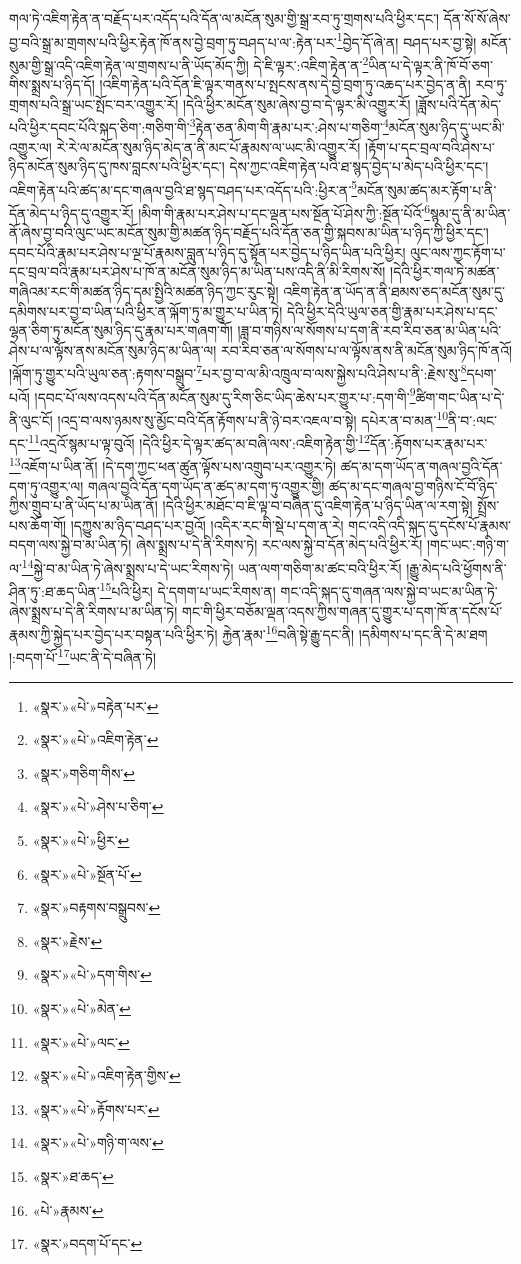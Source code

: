 གལ་ཏེ་འཇིག་རྟེན་ན་བརྗོད་པར་འདོད་པའི་དོན་ལ་མངོན་སུམ་གྱི་སྒྲ་རབ་ཏུ་གྲགས་པའི་ཕྱིར་དང་། དོན་སོ་སོ་ཞེས་བྱ་བའི་སྒྲ་མ་གྲགས་པའི་ཕྱིར་རྟེན་ཁོ་ནས་བྱེ་བྲག་ཏུ་བཤད་པ་ལ་:རྟེན་པར་\footnote{«སྣར་»«པེ་»བརྟེན་པར་}བྱེད་དོ་ཞེ་ན། བཤད་པར་བྱ་སྟེ། མངོན་སུམ་གྱི་སྒྲ་འདི་འཇིག་རྟེན་ལ་གྲགས་པ་ནི་ཡོད་མོད་ཀྱི། དེ་ཇི་ལྟར་:འཇིག་རྟེན་ན་\footnote{«སྣར་»«པེ་»འཇིག་རྟེན་}ཡིན་པ་དེ་ལྟར་ནི་ཁོ་བོ་ཅག་གིས་སྨྲས་པ་ཉིད་དོ། །འཇིག་རྟེན་པའི་དོན་ཇི་ལྟར་གནས་པ་སྤངས་ནས་དེ་བྱེ་བྲག་ཏུ་འཆད་པར་བྱེད་ན་ནི། རབ་ཏུ་གྲགས་པའི་སྒྲ་ཡང་སྤོང་བར་འགྱུར་རོ། །དེའི་ཕྱིར་མངོན་སུམ་ཞེས་བྱ་བ་དེ་ལྟར་མི་འགྱུར་རོ། །ཟློས་པའི་དོན་མེད་པའི་ཕྱིར་དབང་པོའི་སྐད་ཅིག་:གཅིག་གི་\footnote{«སྣར་»གཅིག་གིས་}རྟེན་ཅན་མིག་གི་རྣམ་པར་:ཤེས་པ་གཅིག་\footnote{«སྣར་»«པེ་»ཤེས་པ་ཅིག་}མངོན་སུམ་ཉིད་དུ་ཡང་མི་འགྱུར་ལ། རེ་རེ་ལ་མངོན་སུམ་ཉིད་མེད་ན་ནི་མང་པོ་རྣམས་ལ་ཡང་མི་འགྱུར་རོ། །རྟོག་པ་དང་བྲལ་བའི་ཤེས་པ་ཉིད་མངོན་སུམ་ཉིད་དུ་ཁས་བླངས་པའི་ཕྱིར་དང་། དེས་ཀྱང་འཇིག་རྟེན་པའི་ཐ་སྙད་བྱེད་པ་མེད་པའི་ཕྱིར་དང་། འཇིག་རྟེན་པའི་ཚད་མ་དང་གཞལ་བྱའི་ཐ་སྙད་བཤད་པར་འདོད་པའི་:ཕྱིར་ན་\footnote{«སྣར་»«པེ་»ཕྱིར་}མངོན་སུམ་ཚད་མར་རྟོག་པ་ནི་དོན་མེད་པ་ཉིད་དུ་འགྱུར་རོ། །མིག་གི་རྣམ་པར་ཤེས་པ་དང་ལྡན་པས་སྔོན་པོ་ཤེས་ཀྱི་:སྔོན་པོའོ་\footnote{«སྣར་»«པེ་»སྔོན་པོ་}སྙམ་དུ་ནི་མ་ཡིན་ནོ་ཞེས་བྱ་བའི་ལུང་ཡང་མངོན་སུམ་གྱི་མཚན་ཉིད་བརྗོད་པའི་དོན་ཅན་གྱི་སྐབས་མ་ཡིན་པ་ཉིད་ཀྱི་ཕྱིར་དང་། དབང་པོའི་རྣམ་པར་ཤེས་པ་ལྔ་པོ་རྣམས་བླུན་པ་ཉིད་དུ་སྟོན་པར་བྱེད་པ་ཉིད་ཡིན་པའི་ཕྱིར། ལུང་ལས་ཀྱང་རྟོག་པ་དང་བྲལ་བའི་རྣམ་པར་ཤེས་པ་ཁོ་ན་མངོན་སུམ་ཉིད་མ་ཡིན་པས་འདི་ནི་མི་རིགས་སོ། །དེའི་ཕྱིར་གལ་ཏེ་མཚན་གཞིའམ་རང་གི་མཚན་ཉིད་དམ་སྤྱིའི་མཚན་ཉིད་ཀྱང་རུང་སྟེ། འཇིག་རྟེན་ན་ཡོད་ན་ནི་ཐམས་ཅད་མངོན་སུམ་དུ་དམིགས་པར་བྱ་བ་ཡིན་པའི་ཕྱིར་ན་ལྐོག་ཏུ་མ་གྱུར་པ་ཡིན་ཏེ། དེའི་ཕྱིར་དེའི་ཡུལ་ཅན་གྱི་རྣམ་པར་ཤེས་པ་དང་ལྷན་ཅིག་ཏུ་མངོན་སུམ་ཉིད་དུ་རྣམ་པར་གཞག་གོ། །ཟླ་བ་གཉིས་ལ་སོགས་པ་དག་ནི་རབ་རིབ་ཅན་མ་ཡིན་པའི་ཤེས་པ་ལ་ལྟོས་ནས་མངོན་སུམ་ཉིད་མ་ཡིན་ལ། རབ་རིབ་ཅན་ལ་སོགས་པ་ལ་ལྟོས་ནས་ནི་མངོན་སུམ་ཉིད་ཁོ་ནའོ། །ལྐོག་ཏུ་གྱུར་པའི་ཡུལ་ཅན་:རྟགས་བསྒྲུབ་\footnote{«སྣར་»བརྟགས་བསྒྲུབས་}པར་བྱ་བ་ལ་མི་འཁྲུལ་བ་ལས་སྐྱེས་པའི་ཤེས་པ་ནི་:རྗེས་སུ་\footnote{«སྣར་»རྗེས་}དཔག་པའོ། །དབང་པོ་ལས་འདས་པའི་དོན་མངོན་སུམ་དུ་རིག་ཅིང་ཡིད་ཆེས་པར་གྱུར་པ་:དག་གི་\footnote{«སྣར་»«པེ་»དག་གིས་}ཚིག་གང་ཡིན་པ་དེ་ནི་ལུང་ངོ། །འདྲ་བ་ལས་ཉམས་སུ་མྱོང་བའི་དོན་རྟོགས་པ་ནི་ཉེ་བར་འཇལ་བ་སྟེ། དཔེར་ན་བ་མན་\footnote{«སྣར་»«པེ་»མེན་}ནི་བ་:ལང་དང་\footnote{«སྣར་»«པེ་»ལང་}འདྲའོ་སྙམ་པ་ལྟ་བུའོ། །དེའི་ཕྱིར་དེ་ལྟར་ཚད་མ་བཞི་ལས་:འཇིག་རྟེན་གྱི་\footnote{«སྣར་»«པེ་»འཇིག་རྟེན་གྱིས་}དོན་:རྟོགས་པར་རྣམ་པར་\footnote{«སྣར་»«པེ་»རྟོགས་པར་}འཇོག་པ་ཡིན་ནོ། །དེ་དག་ཀྱང་ཕན་ཚུན་ལྟོས་པས་འགྲུབ་པར་འགྱུར་ཏེ། ཚད་མ་དག་ཡོད་ན་གཞལ་བྱའི་དོན་དག་ཏུ་འགྱུར་ལ། གཞལ་བྱའི་དོན་དག་ཡོད་ན་ཚད་མ་དག་ཏུ་འགྱུར་གྱི། ཚད་མ་དང་གཞལ་བྱ་གཉིས་ངོ་བོ་ཉིད་ཀྱིས་གྲུབ་པ་ནི་ཡོད་པ་མ་ཡིན་ནོ། །དེའི་ཕྱིར་མཐོང་བ་ཇི་ལྟ་བ་བཞིན་དུ་འཇིག་རྟེན་པ་ཉིད་ཡིན་ལ་རག་སྟེ། སྤྲོས་པས་ཆོག་གོ། །དཀྱུས་མ་ཉིད་བཤད་པར་བྱའོ། །འདིར་རང་གི་སྡེ་པ་དག་ན་རེ། གང་འདི་འདི་སྐད་དུ་དངོས་པོ་རྣམས་བདག་ལས་སྐྱེ་བ་མ་ཡིན་ཏེ། ཞེས་སྨྲས་པ་དེ་ནི་རིགས་ཏེ། རང་ལས་སྐྱེ་བ་དོན་མེད་པའི་ཕྱིར་རོ། །གང་ཡང་:གཉི་ག་ལ་\footnote{«སྣར་»«པེ་»གཉི་ག་ལས་}སྐྱེ་བ་མ་ཡིན་ཏེ་ཞེས་སྨྲས་པ་དེ་ཡང་རིགས་ཏེ། ཡན་ལག་གཅིག་མ་ཚང་བའི་ཕྱིར་རོ། །རྒྱུ་མེད་པའི་ཕྱོགས་ནི་ཤིན་ཏུ་:ཐ་ཆད་ཡིན་\footnote{«སྣར་»ཐ་ཆད་}པའི་ཕྱིར། དེ་དགག་པ་ཡང་རིགས་ན། གང་འདི་སྐད་དུ་གཞན་ལས་སྐྱེ་བ་ཡང་མ་ཡིན་ཏེ་ཞེས་སྨྲས་པ་དེ་ནི་རིགས་པ་མ་ཡིན་ཏེ། གང་གི་ཕྱིར་བཅོམ་ལྡན་འདས་ཀྱིས་གཞན་དུ་གྱུར་པ་དག་ཁོ་ན་དངོས་པོ་རྣམས་ཀྱི་སྐྱེད་པར་བྱེད་པར་བསྟན་པའི་ཕྱིར་ཏེ། རྐྱེན་རྣམ་\footnote{«པེ་»རྣམས་}བཞི་སྟེ་རྒྱུ་དང་ནི། །དམིགས་པ་དང་ནི་དེ་མ་ཐག །:བདག་པོ་\footnote{«སྣར་»བདག་པོ་དང་}ཡང་ནི་དེ་བཞིན་ཏེ། 